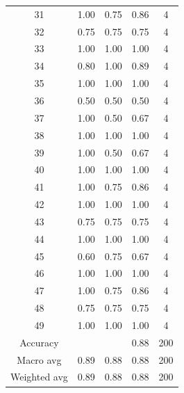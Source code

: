 \documentclass{article}
\begin{document}
\begin{sloppy}
\begin{table}[ht]
\begin{tabular}{|c|c|c|c|c|}
  31 & 1.00 & 0.75 & 0.86 & 4 \\
  32 & 0.75 & 0.75 & 0.75 & 4 \\
  33 & 1.00 & 1.00 & 1.00 & 4 \\
  34 & 0.80 & 1.00 & 0.89 & 4 \\
  35 & 1.00 & 1.00 & 1.00 & 4 \\
  36 & 0.50 & 0.50 & 0.50 & 4 \\
  37 & 1.00 & 0.50 & 0.67 & 4 \\
  38 & 1.00 & 1.00 & 1.00 & 4 \\
  39 & 1.00 & 0.50 & 0.67 & 4 \\
  40 & 1.00 & 1.00 & 1.00 & 4 \\
  41 & 1.00 & 0.75 & 0.86 & 4 \\
  42 & 1.00 & 1.00 & 1.00 & 4 \\
  43 & 0.75 & 0.75 & 0.75 & 4 \\
  44 & 1.00 & 1.00 & 1.00 & 4 \\
  45 & 0.60 & 0.75 & 0.67 & 4 \\
  46 & 1.00 & 1.00 & 1.00 & 4 \\
  47 & 1.00 & 0.75 & 0.86 & 4 \\
  48 & 0.75 & 0.75 & 0.75 & 4 \\
  49 & 1.00 & 1.00 & 1.00 & 4 \\
  \hline
  Accuracy & & & 0.88 & 200 \\
  Macro avg & 0.89 & 0.88 & 0.88 & 200 \\
  Weighted avg & 0.89 & 0.88 & 0.88 & 200 \\
  \hline
  \end{tabular}
\end{table}


\end{sloppy}
\end{document}
